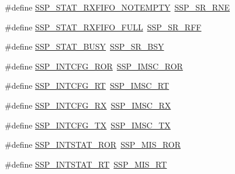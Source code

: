\begin{DoxyCompactItemize}
\item 
\#define \hyperlink{group___s_s_p___public___macros_ga3b0ac9bf74e9d93e0a60a225ada68504}{\-S\-S\-P\-\_\-\-S\-T\-A\-T\-\_\-\-R\-X\-F\-I\-F\-O\-\_\-\-N\-O\-T\-E\-M\-P\-T\-Y}~\hyperlink{group___s_s_p___private___macros_ga67740be98d73a50bf341ca3e2c25da6e}{\-S\-S\-P\-\_\-\-S\-R\-\_\-\-R\-N\-E}
\item 
\#define \hyperlink{group___s_s_p___public___macros_ga12ae92a4672cd13f9e3c4b1330384d0e}{\-S\-S\-P\-\_\-\-S\-T\-A\-T\-\_\-\-R\-X\-F\-I\-F\-O\-\_\-\-F\-U\-L\-L}~\hyperlink{group___s_s_p___private___macros_gacb3442f8b9ec2dbb3be63f154cc58940}{\-S\-S\-P\-\_\-\-S\-R\-\_\-\-R\-F\-F}
\item 
\#define \hyperlink{group___s_s_p___public___macros_ga618e52f34a11a7e9414d18a2e56be63c}{\-S\-S\-P\-\_\-\-S\-T\-A\-T\-\_\-\-B\-U\-S\-Y}~\hyperlink{group___s_s_p___private___macros_gac57c889d98458cfbde35f0ab63b499c2}{\-S\-S\-P\-\_\-\-S\-R\-\_\-\-B\-S\-Y}
\item 
\#define \hyperlink{group___s_s_p___public___macros_ga7db87dea06af8ba8368be4dcccfd97d3}{\-S\-S\-P\-\_\-\-I\-N\-T\-C\-F\-G\-\_\-\-R\-O\-R}~\hyperlink{group___s_s_p___private___macros_gaa004d331d2d6bf2fc123de80d6e18a95}{\-S\-S\-P\-\_\-\-I\-M\-S\-C\-\_\-\-R\-O\-R}
\item 
\#define \hyperlink{group___s_s_p___public___macros_ga4716c2b633cc0698f6e515ffb7abedbd}{\-S\-S\-P\-\_\-\-I\-N\-T\-C\-F\-G\-\_\-\-R\-T}~\hyperlink{group___s_s_p___private___macros_ga0396910287899ff6ab730425a8a332c7}{\-S\-S\-P\-\_\-\-I\-M\-S\-C\-\_\-\-R\-T}
\item 
\#define \hyperlink{group___s_s_p___public___macros_ga20c9695e3dde083db7f54d6715c5573c}{\-S\-S\-P\-\_\-\-I\-N\-T\-C\-F\-G\-\_\-\-R\-X}~\hyperlink{group___s_s_p___private___macros_ga9f4d1fa05f49655cc6e5548b11dfe092}{\-S\-S\-P\-\_\-\-I\-M\-S\-C\-\_\-\-R\-X}
\item 
\#define \hyperlink{group___s_s_p___public___macros_ga12314c10c13b5663431e2f3d794d8e6d}{\-S\-S\-P\-\_\-\-I\-N\-T\-C\-F\-G\-\_\-\-T\-X}~\hyperlink{group___s_s_p___private___macros_ga0e1c817c6d276a0fd17b0c4d21668818}{\-S\-S\-P\-\_\-\-I\-M\-S\-C\-\_\-\-T\-X}
\item 
\#define \hyperlink{group___s_s_p___public___macros_ga849060f3ae22fc69e37410b1607c6d49}{\-S\-S\-P\-\_\-\-I\-N\-T\-S\-T\-A\-T\-\_\-\-R\-O\-R}~\hyperlink{group___s_s_p___private___macros_ga5ab078b780d3ab049afbc4bf1d548164}{\-S\-S\-P\-\_\-\-M\-I\-S\-\_\-\-R\-O\-R}
\item 
\#define \hyperlink{group___s_s_p___public___macros_gaec7fec10a4c64bd3391c91c832e040c5}{\-S\-S\-P\-\_\-\-I\-N\-T\-S\-T\-A\-T\-\_\-\-R\-T}~\hyperlink{group___s_s_p___private___macros_gac656007811dd29f2448a6a534aee04a3}{\-S\-S\-P\-\_\-\-M\-I\-S\-\_\-\-R\-T}

\end{DoxyCompactItemize}
